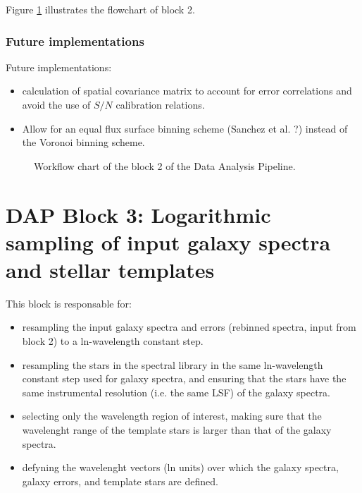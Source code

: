 \documentclass[11pt]{book}
\begin{document}
Figure \ref{dap_fig:block2} illustrates the flowchart of block 2.

\subsubsection{Future implementations}
Future implementations:

\begin{itemize}

 \item calculation of spatial covariance matrix to account for error
   correlations and avoid the use of $S/N$ calibration relations.

  \item Allow for an equal flux surface binning scheme (Sanchez et
    al. ?) instead of the Voronoi binning scheme.

\end{itemize}

\begin{figure}
\begin{center}
\caption{Workflow chart of the block 2 of the Data Analysis
  Pipeline.}
 \label{dap_fig:block2}
\end{center}
\end{figure}



\section[DAP Block 3: Logarithmic sampling]{DAP Block 3: Logarithmic sampling of input galaxy spectra and stellar templates}
\label{dap_sec:block3}

This block is responsable for:

\begin{itemize}

\item resampling the input galaxy spectra and errors (rebinned
  spectra, input from block 2) to a ln-wavelength constant step.

\item resampling the stars in the spectral library in the same
  ln-wavelength constant step used for galaxy spectra, and ensuring
  that the stars have the same instrumental resolution (i.e. the same
  LSF) of the galaxy spectra.

\item selecting only the wavelength region of interest, making sure
  that the wavelenght range of the template stars is larger than that
  of the galaxy spectra.

\item defyning the wavelenght vectors (ln units) over which the galaxy
  spectra, galaxy errors, and template stars are defined.

\end{itemize}
\end{document}
